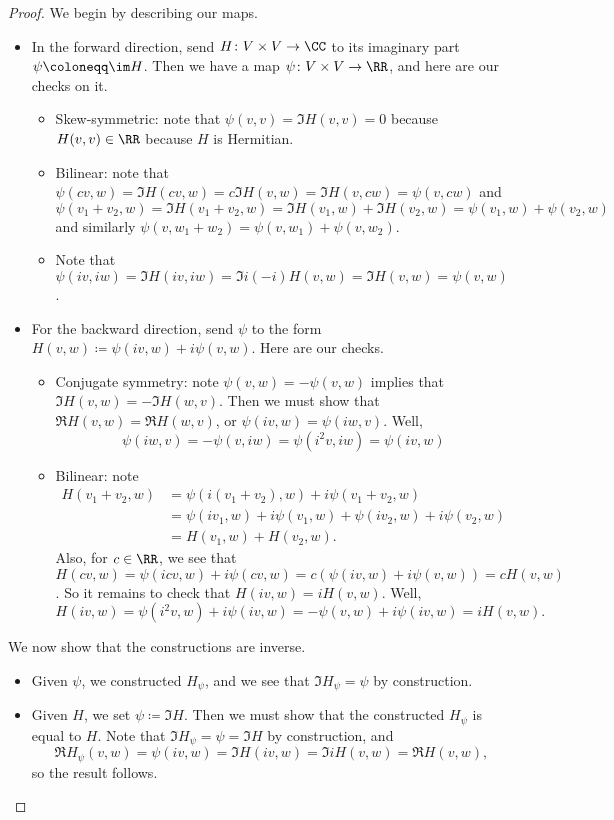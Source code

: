 \documentclass[../notes.tex]{subfiles}
\begin{document}
\begin{proof}
	We begin by describing our maps.
	\begin{itemize}
		\item In the forward direction, send $H\colon V\times V\to\CC$ to its imaginary part $\psi\coloneqq\im H$. Then we have a map $\psi\colon V\times V\to\RR$, and here are our checks on it.
		\begin{itemize}
			\item Skew-symmetric: note that $\psi(v,v)=\Im H(v,v)=0$ because $H(v,v)\in\RR$ because $H$ is Hermitian.
			\item Bilinear: note that $\psi(cv,w)=\Im H(cv,w)=c\Im H(v,w)=\Im H(v,cw)=\psi(v,cw)$ and
			\[\psi(v_1+v_2,w)=\Im H(v_1+v_2,w)=\Im H(v_1,w)+\Im H(v_2,w)=\psi(v_1,w)+\psi(v_2,w)\]
			and similarly $\psi(v,w_1+w_2)=\psi(v,w_1)+\psi(v,w_2)$.
			\item Note that $\psi(iv,iw)=\Im H(iv,iw)=\Im i(-i)H(v,w)=\Im H(v,w)=\psi(v,w)$.
		\end{itemize}
		\item For the backward direction, send $\psi$ to the form $H(v,w)\coloneqq\psi(iv,w)+i\psi(v,w)$. Here are our checks.
		\begin{itemize}
			\item Conjugate symmetry: note $\psi(v,w)=-\psi(v,w)$ implies that $\Im H(v,w)=-\Im H(w,v)$. Then we must show that $\Re H(v,w)=\Re H(w,v)$, or $\psi(iv,w)=\psi(iw,v)$. Well,
			\[\psi(iw,v)=-\psi(v,iw)=\psi\left(i^2v,iw\right)=\psi(iv,w)\]
			\item Bilinear: note
			\begin{align*}
				H(v_1+v_2,w) &= \psi(i(v_1+v_2),w)+i\psi(v_1+v_2,w) \\
				&= \psi(iv_1,w)+i\psi(v_1,w)+\psi(iv_2,w)+i\psi(v_2,w) \\
				&= H(v_1,w)+H(v_2,w).
			\end{align*}
			Also, for $c\in\RR$, we see that $H(cv,w)=\psi(icv,w)+i\psi(cv,w)=c(\psi(iv,w)+i\psi(v,w))=cH(v,w)$. So it remains to check that $H(iv,w)=iH(v,w)$. Well,
			\[H(iv,w)=\psi\left(i^2v,w\right)+i\psi(iv,w)=-\psi(v,w)+i\psi(iv,w)=iH(v,w).\]
		\end{itemize}
	\end{itemize}
	We now show that the constructions are inverse.
	\begin{itemize}
		\item Given $\psi$, we constructed $H_\psi$, and we see that $\Im H_\psi=\psi$ by construction.
		\item Given $H$, we set $\psi\coloneqq\Im H$. Then we must show that the constructed $H_\psi$ is equal to $H$. Note that $\Im H_\psi=\psi=\Im H$ by construction, and
		\[\Re H_\psi(v,w)=\psi(iv,w)=\Im H(iv,w)=\Im iH(v,w)=\Re H(v,w),\]
		so the result follows.
		\qedhere
	\end{itemize}
\end{proof}
\end{document}
